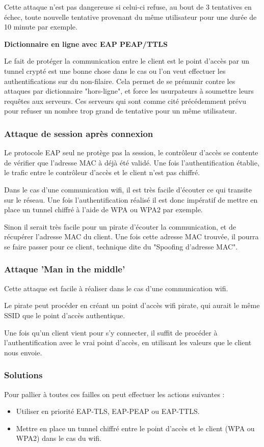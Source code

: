 Cette attaque n'est pas dangereuse si celui-ci refuse, au bout de 3 tentatives en échec, toute nouvelle tentative provenant du même utilisateur pour une durée de 10 minute par exemple. 

\textbf{Dictionnaire en ligne avec EAP PEAP/TTLS}

Le fait de protéger la communication entre le client est le point d'accès par un tunnel crypté est une bonne chose dans le cas ou l'on veut effectuer les authentifications sur du non-filaire.
Cela permet de se prémunir contre les attaques par dictionnaire "hors-ligne", et force les usurpateurs à soumettre leurs requêtes aux serveurs. 
Ces serveurs qui sont comme cité précédemment prévu pour refuser un nombre trop grand de tentative pour un même utilisateur. 

\subsubsection{Attaque de session après connexion}

Le protocole EAP seul ne protège pas la session, le contrôleur d’accès se contente de vérifier que l’adresse MAC à déjà été validé. Une fois l’authentification établie, le trafic entre le contrôleur d'accès et le client n’est pas chiffré. 

Dans le cas d’une communication wifi, il est très facile d'écouter ce qui transite sur le réseau. Une fois l'authentification réalisé il est donc impératif de mettre en place un tunnel chiffré à l’aide de WPA ou WPA2 par exemple. 

Sinon il serait très facile pour un pirate d'écouter la communication, et de récupérer l'adresse MAC du client. Une fois cette adresse MAC trouvée, il pourra se faire passer pour ce client, technique dite du "Spoofing d'adresse MAC". 

\subsubsection{Attaque 'Man in the middle'}

Cette attaque est facile à réaliser dans le cas d’une communication wifi. 

Le pirate peut procéder en créant un point d'accès wifi pirate, qui aurait le même SSID que le point d'accès authentique. 

Une fois qu'un client vient pour s'y connecter, il suffit de procéder à l'authentification avec le vrai point d'accès, en utilisant les valeurs que le client nous envoie. 

\subsubsection{Solutions}

Pour pallier à toutes ces failles on peut effectuer les actions suivantes : 
\begin{itemize}
\item Utiliser en priorité EAP-TLS, EAP-PEAP ou EAP-TTLS. 
\item Mettre en place un tunnel chiffré entre le point d’accès et le client (WPA ou WPA2) dans le cas du wifi. 
\end{itemize}
